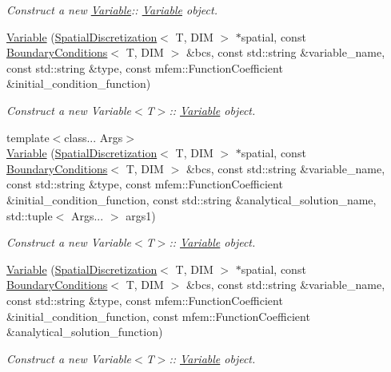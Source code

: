\begin{DoxyCompactItemize}
\begin{DoxyCompactList}\small\item\em Construct a new \hyperlink{classVariable}{Variable}\+:\+: \hyperlink{classVariable}{Variable} object. \end{DoxyCompactList}\item 
\hyperlink{classVariable_a30640b324b430e23f29eb556a95db9e1}{Variable} (\hyperlink{classSpatialDiscretization}{Spatial\+Discretization}$<$ T, D\+IM $>$ $\ast$spatial, const \hyperlink{classBoundaryConditions}{Boundary\+Conditions}$<$ T, D\+IM $>$ \&bcs, const std\+::string \&variable\+\_\+name, const std\+::string \&type, const mfem\+::\+Function\+Coefficient \&initial\+\_\+condition\+\_\+function)
\begin{DoxyCompactList}\small\item\em Construct a new Variable$<$\+T$>$\+:\+: \hyperlink{classVariable}{Variable} object. \end{DoxyCompactList}\item 
{\footnotesize template$<$class... Args$>$ }\\\hyperlink{classVariable_a7ad6667b0616b3b1959fec2154677f2e}{Variable} (\hyperlink{classSpatialDiscretization}{Spatial\+Discretization}$<$ T, D\+IM $>$ $\ast$spatial, const \hyperlink{classBoundaryConditions}{Boundary\+Conditions}$<$ T, D\+IM $>$ \&bcs, const std\+::string \&variable\+\_\+name, const std\+::string \&type, const mfem\+::\+Function\+Coefficient \&initial\+\_\+condition\+\_\+function, const std\+::string \&analytical\+\_\+solution\+\_\+name, std\+::tuple$<$ Args... $>$ args1)
\begin{DoxyCompactList}\small\item\em Construct a new Variable$<$\+T$>$\+:\+: \hyperlink{classVariable}{Variable} object. \end{DoxyCompactList}\item 
\hyperlink{classVariable_acf7cb34f3ae57dc1ff44da2347125f88}{Variable} (\hyperlink{classSpatialDiscretization}{Spatial\+Discretization}$<$ T, D\+IM $>$ $\ast$spatial, const \hyperlink{classBoundaryConditions}{Boundary\+Conditions}$<$ T, D\+IM $>$ \&bcs, const std\+::string \&variable\+\_\+name, const std\+::string \&type, const mfem\+::\+Function\+Coefficient \&initial\+\_\+condition\+\_\+function, const mfem\+::\+Function\+Coefficient \&analytical\+\_\+solution\+\_\+function)
\begin{DoxyCompactList}\small\item\em Construct a new Variable$<$\+T$>$\+:\+: \hyperlink{classVariable}{Variable} object. \end{DoxyCompactList}\item 

\end{DoxyCompactItemize}
